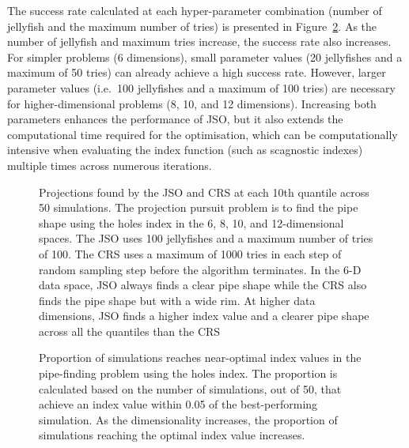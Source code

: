 \documentclass[
  12pt,
]{interact}
\theoremstyle{plain}
\begin{document}
The success rate calculated at each hyper-parameter combination (number
of jellyfish and the maximum number of tries) is presented in
Figure~\ref{fig-proportion}. As the number of jellyfish and maximum
tries increase, the success rate also increases. For simpler problems (6
dimensions), small parameter values (20 jellyfishes and a maximum of 50
tries) can already achieve a high success rate. However, larger
parameter values (i.e.~100 jellyfishes and a maximum of 100 tries) are
necessary for higher-dimensional problems (8, 10, and 12 dimensions).
Increasing both parameters enhances the performance of JSO, but it also
extends the computational time required for the optimisation, which can
be computationally intensive when evaluating the index function (such as
scagnostic indexes) multiple times across numerous iterations.

\begin{figure}


\caption{\label{fig-proj}Projections found by the JSO and CRS at each
10th quantile across 50 simulations. The projection pursuit problem is
to find the pipe shape using the holes index in the 6, 8, 10, and
12-dimensional spaces. The JSO uses 100 jellyfishes and a maximum number
of tries of 100. The CRS uses a maximum of 1000 tries in each step of
random sampling step before the algorithm terminates. In the 6-D data
space, JSO always finds a clear pipe shape while the CRS also finds the
pipe shape but with a wide rim. At higher data dimensions, JSO finds a
higher index value and a clearer pipe shape across all the quantiles
than the CRS}

\end{figure}%

\begin{figure}


\caption{\label{fig-proportion}Proportion of simulations reaches
near-optimal index values in the pipe-finding problem using the holes
index. The proportion is calculated based on the number of simulations,
out of 50, that achieve an index value within 0.05 of the
best-performing simulation. As the dimensionality increases, the
proportion of simulations reaching the optimal index value increases.}

\end{figure}%
\end{document}
